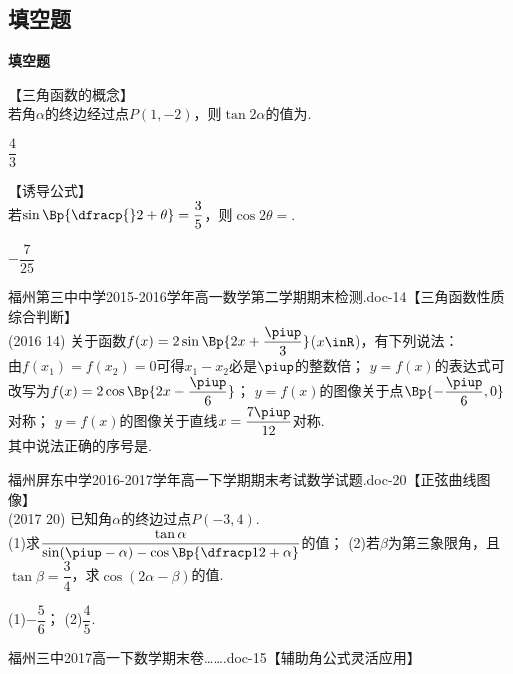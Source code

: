   \subsection{填空题}
  \begin{exercise}{\bf 填空题}
    \item 【三角函数的概念】\\
      若角$\alpha$的终边经过点$P(1,-2)$，则$\tan{2\alpha}$的值为\tk.
      \begin{answer}
        $\dfrac43$
      \end{answer}
    \item 【诱导公式】\\
      若$\sin\Bp{\dfracp{}2+\theta}=\dfrac35$，则$\cos{2\theta}=$\tk.
      \begin{answer}
        $-\dfrac7{25}$
      \end{answer}
    \item 福州第三中中学2015-2016学年高一数学第二学期期末检测.doc-14【三角函数性质 综合判断】\\
      (2016  14)
      关于函数$f(x)=2\sin\Bp{2x+\dfrac{\piup}3}$($x\inR$)，有下列说法：\\
      由$f(x_1)=f(x_2)=0$可得$x_1-x_2$必是$\piup$的整数倍；
      $y=f(x)$的表达式可改写为$f(x)=2\cos\Bp{2x-\dfrac{\piup}6}$；
      $y=f(x)$的图像关于点$\Bp{-\dfrac{\piup}6,0}$对称；
      $y=f(x)$的图像关于直线$x=\dfrac{7\piup}{12}$对称.\\
      其中说法正确的序号是\tk.
      \begin{answer}
      \end{answer}
    \item 福州屏东中学2016-2017学年高一下学期期末考试数学试题.doc-20【正弦曲线图像】\\
      (2017  20)
      已知角$\alpha$的终边过点$P(-3,4)$.\\
      (1)求$\dfrac{\tan\alpha}{\sin(\piup-\alpha)-\cos\Bp{\dfracp12+\alpha}}$的值；\quad
      (2)若$\beta$为第三象限角，且$\tan\beta=\dfrac34$，求$\cos(2\alpha-\beta)$的值.
      \begin{answer}
        (1)$-\dfrac56$；
        (2)$\dfrac45$.
      \end{answer}
    \item 福州三中2017高一下数学期末卷…….doc-15【辅助角公式灵活应用】\\

\end{exercise}

